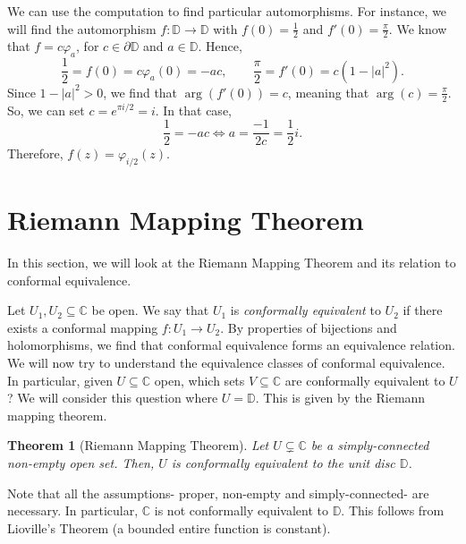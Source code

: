 \documentclass[a4paper, openany]{memoir}
\theoremstyle{definition}
\theoremstyle{plain}
\newtheorem{theorem}[definition]{Theorem}
\begin{document}
    We can use the computation to find particular automorphisms. For instance, we will find the automorphism $f \colon \mathbb{D} \to \mathbb{D}$ with $f(0) = \frac{1}{2}$ and $f'(0) = \frac{\pi}{2}$. We know that $f = c\varphi_a$, for $c \in \partial \mathbb{D}$ and $a \in \mathbb{D}$. Hence,
    \[\frac{1}{2} = f(0) = c\varphi_a(0) = -ac, \qquad \frac{\pi}{2} = f'(0) = c(1 - |a|^2).\]
    Since $1 - |a|^2 > 0$, we find that $\arg (f'(0)) = c$, meaning that $\arg (c) = \frac{\pi}{2}$. So, we can set $c = e^{\pi i/2} =  i$. In that case,
    \[\frac{1}{2} = -ac \iff a = \frac{-1}{2c} = \frac{1}{2}i.\]
    Therefore, $f(z) = \varphi_{i/2}(z)$.
    \newpage

    \section{Riemann Mapping Theorem}
    In this section, we will look at the Riemann Mapping Theorem and its relation to conformal equivalence.
    
    Let $U_1, U_2 \subseteq \mathbb{C}$ be open. We say that $U_1$ is \emph{conformally equivalent} to $U_2$ if there exists a conformal mapping $f \colon U_1 \to U_2$. By properties of bijections and holomorphisms, we find that conformal equivalence forms an equivalence relation. We will now try to understand the equivalence classes of conformal equivalence. In particular, given $U \subseteq \mathbb{C}$ open, which sets $V \subseteq \mathbb{C}$ are conformally equivalent to $U$? We will consider this question where $U = \mathbb{D}$. This is given by the Riemann mapping theorem.
    \begin{theorem}[Riemann Mapping Theorem]
        Let $U \subsetneq \mathbb{C}$ be a simply-connected non-empty open set. Then, $U$ is conformally equivalent to the unit disc $\mathbb{D}$.
    \end{theorem}
    \noindent Note that all the assumptions- proper, non-empty and simply-connected- are necessary. In particular, $\mathbb{C}$ is not conformally equivalent to $\mathbb{D}$. This follows from Lioville's Theorem (a bounded entire function is constant).
\end{document}
